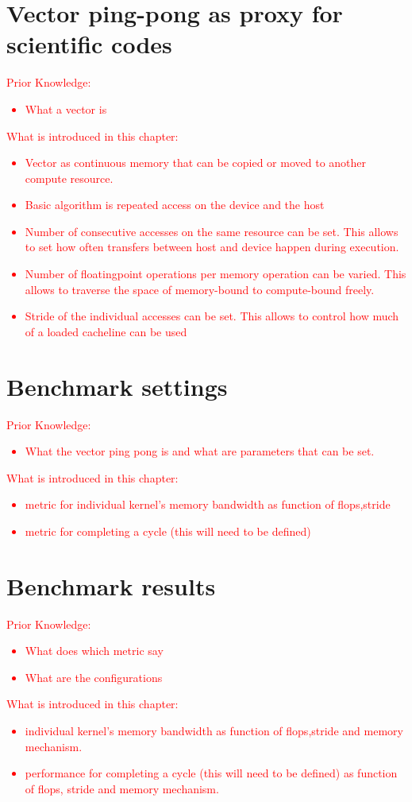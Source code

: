 \documentclass[a4paper,10pt]{scrartcl}
\newcommand\gist[1]{\textcolor{red}{#1}}
\begin{document}
\section{Vector ping-pong as proxy for scientific codes}
\gist{
  Prior Knowledge:
\begin{itemize}
\item What a vector is
\end{itemize}
  What is introduced in this chapter:
\begin{itemize}
\item Vector as continuous memory that can be copied or moved to another compute resource.
\item Basic algorithm is repeated access on the device and the host
\item Number of consecutive accesses on the same resource can be set. This allows to set how often transfers between host and device happen during execution.
\item Number of floatingpoint operations per memory operation can be varied. This allows to traverse the space of memory-bound to compute-bound freely.
\item Stride of the individual accesses can be set. This allows to control how much of a loaded cacheline can be used
\end{itemize}
}

\section{Benchmark settings}
\gist{
  Prior Knowledge:
\begin{itemize}
\item What the vector ping pong is and what are parameters that can be set.
\end{itemize}
  What is introduced in this chapter:
\begin{itemize}
\item metric for individual kernel's memory bandwidth as function of flops,stride
\item metric for completing a cycle (this will need to be defined)
\end{itemize}
}

\section{Benchmark results}
\gist{
  Prior Knowledge:
\begin{itemize}
\item What does which metric say
\item What are the configurations
\end{itemize}
  What is introduced in this chapter:
\begin{itemize}
\item individual kernel's memory bandwidth as function of flops,stride and memory mechanism.
\item performance for completing a cycle (this will need to be defined) as function of flops, stride and memory mechanism.
\end{itemize}
}
\end{document}
